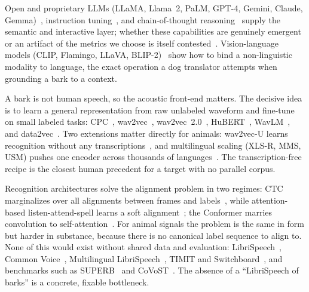 Open and proprietary LLMs (LLaMA, Llama~2, PaLM, GPT-4, Gemini, Claude,
Gemma)~\cite{touvron2023llama,touvron2023llama2,chowdhery2023palm,openai2023gpt4,gemini2024,anthropic2024claude,gemma2024},
instruction tuning~\cite{ouyang2022instruct}, and chain-of-thought
reasoning~\cite{wei2022chain} supply the semantic and interactive layer;
whether these capabilities are genuinely emergent or an artifact of the
metrics we choose is itself contested~\cite{wei2022emergent,schaeffer2023mirage}.
Vision-language models (CLIP, Flamingo, LLaVA,
BLIP-2)~\cite{radford2021clip,alayrac2022flamingo,liu2023llava,li2023blip2}
show how to bind a non-linguistic modality to language, the exact operation
a dog translator attempts when grounding a bark to a context.

A bark is not human speech, so the acoustic front-end matters. The decisive
idea is to learn a general representation from raw unlabeled waveform and
fine-tune on small labeled tasks: CPC~\cite{vandenoord2018cpc},
wav2vec~\cite{schneider2019wav2vec}, wav2vec~2.0~\cite{baevski2020wav2vec2},
HuBERT~\cite{hsu2021hubert}, WavLM~\cite{chen2022wavlm}, and
data2vec~\cite{baevski2022data2vec,baevski2023data2vec2}. Two extensions
matter directly for animals: wav2vec-U learns recognition without any
transcriptions~\cite{baevski2021wav2vecu}, and multilingual scaling (XLS-R,
MMS, USM) pushes one encoder across thousands of
languages~\cite{babu2022xlsr,pratap2023mms,zhang2023usm}. The
transcription-free recipe is the closest human precedent for a target with
no parallel corpus.

Recognition architectures solve the alignment problem in two regimes: CTC
marginalizes over all alignments between frames and
labels~\cite{graves2006ctc,graves2013speech,amodei2016deepspeech2}, while
attention-based listen-attend-spell learns a soft
alignment~\cite{chan2016las}; the Conformer marries convolution to
self-attention~\cite{gulati2020conformer}. For animal signals the problem is
the same in form but harder in substance, because there is no canonical
label sequence to align to. None of this would exist without shared data
and evaluation: LibriSpeech~\cite{panayotov2015librispeech}, Common
Voice~\cite{ardila2020commonvoice}, Multilingual
LibriSpeech~\cite{pratap2020mls}, TIMIT and
Switchboard~\cite{garofolo1993timit,godfrey1992switchboard}, and benchmarks
such as SUPERB~\cite{yang2021superb} and
CoVoST~\cite{wang2020covost,wang2021covost2}. The absence of a ``LibriSpeech
of barks'' is a concrete, fixable bottleneck.

